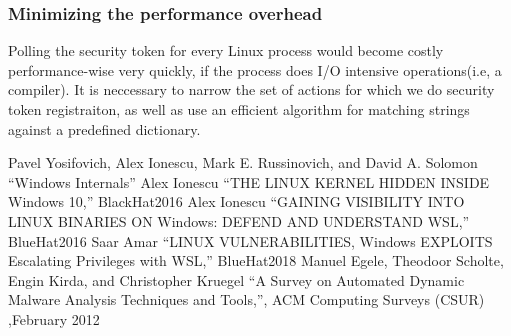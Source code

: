 \documentclass[conference]{IEEEtran}
\begin{document}
    \subsubsection{Minimizing the performance overhead}
    Polling the security token for every Linux process would become costly performance-wise very quickly, if the process does I/O
    intensive operations(i.e, a compiler). It is neccessary to narrow the set of actions for which we do security token registraiton, as well
    as use an efficient algorithm for matching strings against a predefined dictionary.\\


\begin{thebibliography}{00}
 Pavel Yosifovich, Alex Ionescu, Mark E. Russinovich, and  David A. Solomon ``Windows Internals''
 Alex Ionescu ``THE LINUX KERNEL HIDDEN INSIDE Windows 10,'' BlackHat2016
 Alex Ionescu ``GAINING VISIBILITY INTO LINUX BINARIES ON Windows: DEFEND AND UNDERSTAND WSL,'' BlueHat2016
 Saar Amar ``LINUX VULNERABILITIES, Windows EXPLOITS Escalating Privileges with WSL,'' BlueHat2018
 Manuel Egele, Theodoor Scholte, Engin Kirda, and Christopher Kruegel ``A Survey on Automated Dynamic Malware Analysis Techniques and Tools,'', ACM Computing Surveys (CSUR) ,February 2012
\end{thebibliography}
\end{document}
